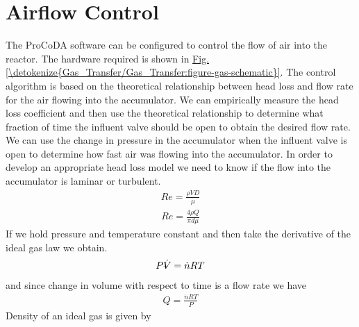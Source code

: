 \documentclass[letterpaper,10pt,english]{sphinxmanual}
\begin{document}
\section{Airflow Control}
\label{\detokenize{Gas_Transfer/Gas_Transfer:airflow-control}}\label{\detokenize{Gas_Transfer/Gas_Transfer:heading-gas-transfer-airflow-control}}
The ProCoDA software can be configured to control the flow of air into the reactor. The hardware required is shown in \hyperref[\detokenize{Gas_Transfer/Gas_Transfer:figure-gas-schematic}]{Fig.\@ \ref{\detokenize{Gas_Transfer/Gas_Transfer:figure-gas-schematic}}}. The control algorithm is based on the theoretical relationship between head loss and flow rate for the air flowing into the accumulator. We can empirically measure the head loss coefficient and then use the theoretical relationship to determine what fraction of time the influent valve should be open to obtain the desired flow rate. We can use the change in pressure in the accumulator when the influent valve is open to determine how fast air was flowing into the accumulator. In order to develop an appropriate head loss model we need to know if the flow into the accumulator is laminar or turbulent.
\begin{equation}\label{equation:Gas_Transfer/Gas_Transfer:eq_Gas_Re}
\begin{split}{Re}=\frac{\rho VD}{\mu }\end{split}
\end{equation}\begin{equation}\label{equation:Gas_Transfer/Gas_Transfer:Gas_Transfer/Gas_Transfer:9}
\begin{split}{Re}=\frac{4\rho Q}{\pi d\mu }\end{split}
\end{equation}
If we hold pressure and temperature constant and then take the derivative of the ideal gas law we obtain.
\begin{equation}\label{equation:Gas_Transfer/Gas_Transfer:Gas_Transfer/Gas_Transfer:10}
\begin{split}P\rlap{--}\dot{V}=\dot{n}RT\end{split}
\end{equation}
and since change in volume with respect to time is a flow rate we have
\begin{equation}\label{equation:Gas_Transfer/Gas_Transfer:eq_Gas_Qair}
\begin{split}Q=\frac{\dot{n}RT}{P}\end{split}
\end{equation}
Density of an ideal gas is given by
\end{document}
